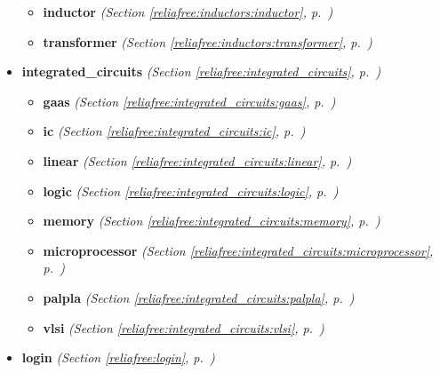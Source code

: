 \begin{itemize}
\begin{itemize}
    \item \textbf{inductor}
  \textit{(Section \ref{reliafree:inductors:inductor}, p.~\pageref{reliafree:inductors:inductor})}

    \item \textbf{transformer}
  \textit{(Section \ref{reliafree:inductors:transformer}, p.~\pageref{reliafree:inductors:transformer})}

  \end{itemize}
\item \textbf{integrated\_circuits}
  \textit{(Section \ref{reliafree:integrated_circuits}, p.~\pageref{reliafree:integrated_circuits})}

  \begin{itemize}
\setlength{\parskip}{0ex}
    \item \textbf{gaas}
  \textit{(Section \ref{reliafree:integrated_circuits:gaas}, p.~\pageref{reliafree:integrated_circuits:gaas})}

    \item \textbf{ic}
  \textit{(Section \ref{reliafree:integrated_circuits:ic}, p.~\pageref{reliafree:integrated_circuits:ic})}

    \item \textbf{linear}
  \textit{(Section \ref{reliafree:integrated_circuits:linear}, p.~\pageref{reliafree:integrated_circuits:linear})}

    \item \textbf{logic}
  \textit{(Section \ref{reliafree:integrated_circuits:logic}, p.~\pageref{reliafree:integrated_circuits:logic})}

    \item \textbf{memory}
  \textit{(Section \ref{reliafree:integrated_circuits:memory}, p.~\pageref{reliafree:integrated_circuits:memory})}

    \item \textbf{microprocessor}
  \textit{(Section \ref{reliafree:integrated_circuits:microprocessor}, p.~\pageref{reliafree:integrated_circuits:microprocessor})}

    \item \textbf{palpla}
  \textit{(Section \ref{reliafree:integrated_circuits:palpla}, p.~\pageref{reliafree:integrated_circuits:palpla})}

    \item \textbf{vlsi}
  \textit{(Section \ref{reliafree:integrated_circuits:vlsi}, p.~\pageref{reliafree:integrated_circuits:vlsi})}

  \end{itemize}
\item \textbf{login}
  \textit{(Section \ref{reliafree:login}, p.~\pageref{reliafree:login})}


\end{itemize}
